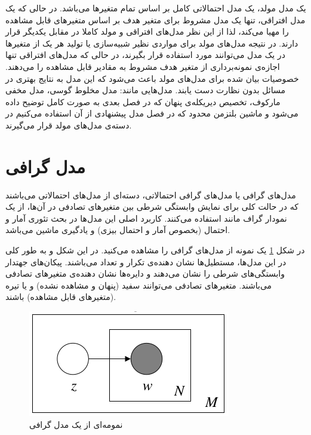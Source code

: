 	یک مدل مولد، یک مدل احتمالاتی کامل بر اساس تمام متغیر‌ها می‌‌باشد. در حالی‌ که یک مدل افتراقی، تنها یک مدل مشروط برای متغیر هدف
	بر اساس متغیر‌های قابل مشاهده را مهیا می‌‌کند، لذا از این نظر مدل‌های افتراقی و مولد کاملا در مقابل یکدیگر قرار دارند. در نتیجه مدل‌های مولد برای مواردی نظیر شبیه‌سازی یا تولید هر یک از متغیر‌ها در یک مدل می‌‌توانند مورد استفاده قرار بگیرند، در حالی‌ که مدل‌های افتراقی تنها اجازه‌ی نمونه‌برداری
	از متغیر هدف مشروط به مقادیر قابل مشاهده را می‌‌دهند. خصوصیات بیان شده برای مدل‌های مولد باعث می‌‌شود که این مدل به نتایج بهتری در مسائل بدون نظارت  دست یابند. مدل‌هایی مانند: مدل مخلوط گوسی، مدل مخفی‌ مارکوف، تخصیص دیریکله‌ی پنهان
	که در فصل بعدی به صورت کامل توضیح داده می‌‌شود و ماشین بلتزمن محدود
	که در فصل مدل پیشنهادی از آن استفاده می‌کنیم در دسته‌ی مدل‌های مولد قرار می‌‌گیرند.
\section{مدل گرافی}
\label{chap2sec4}
مدل‌های گرافی
یا مدل‌های گرافی احتمالاتی، دسته‌ای از مدل‌های احتمالاتی می‌‌باشند که در حالت کلی‌ برای نمایش وابستگی شرطی بین متغیر‌های تصادفی در آن‌ها، از یک نمودار گراف مانند استفاده می‌‌کنند. کاربرد اصلی‌ این مدل‌ها در بحث تئوری آمار و احتمال (بخصوص آمار و احتمال بیزی) و یادگیری ماشین می‌‌باشد.

در شکل
\ref{chap2-fig4}
یک نمونه از مدل‌های گرافی‌ را مشاهده می‌‌کنید. در این شکل و به طور کلی‌ در این مدل‌ها، مستطیل‌ها نشان دهنده‌ی تکرار و تعداد می‌‌باشند. پیکان‌های جهتدار وابستگی‌های شرطی را نشان می‌‌دهند و دایره‌ها نشان دهنده‌ی متغیر‌های تصادفی می‌‌باشند. متغیر‌های تصادفی می‌‌توانند سفید‌ (پنهان و مشاهده نشده) و یا تیره (متغیر‌های قابل مشاهده) باشند.
\begin{figure}[!t]
	\centering
	\includegraphics[scale=0.5]{chap2-img/graphicalmodel}
	\caption{نمومه‌ای از یک مدل گرافی \cite{blei2003latent}}
	\label{chap2-fig4}
\end{figure}

